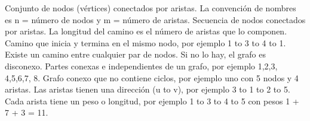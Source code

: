 \markdownRendererDocumentBegin
\markdownRendererSectionBegin
{}\markdownRendererInterblockSeparator
{}\markdownRendererSectionBegin
{}\markdownRendererInterblockSeparator
{}\markdownRendererHardLineBreak
{}Conjunto de nodos (vértices) conectados por aristas.\markdownRendererHardLineBreak
{}La convención de nombres es \markdownRendererDollarSign{}n =\markdownRendererDollarSign{} número de nodos y \markdownRendererDollarSign{}m =\markdownRendererDollarSign{} número de aristas.\markdownRendererParagraphSeparator
{}\markdownRendererHardLineBreak
{}Secuencia de nodos conectados por aristas. La longitud del camino es el número de aristas que lo componen.\markdownRendererParagraphSeparator
{}\markdownRendererHardLineBreak
{}Camino que inicia y termina en el mismo nodo, por ejemplo \markdownRendererDollarSign{}1 \markdownRendererBackslash{}to 3 \markdownRendererBackslash{}to 4 \markdownRendererBackslash{}to 1\markdownRendererDollarSign{}.\markdownRendererParagraphSeparator
{}\markdownRendererHardLineBreak
{}Existe un camino entre cualquier par de nodos. Si no lo hay, el grafo es disconexo.\markdownRendererParagraphSeparator
{}\markdownRendererHardLineBreak
{}Partes conexas e independientes de un grafo, por ejemplo \markdownRendererDollarSign{}\markdownRendererLeftBrace{}1,2,3\markdownRendererRightBrace{}, \markdownRendererLeftBrace{}4,5,6,7\markdownRendererRightBrace{}, \markdownRendererLeftBrace{}8\markdownRendererRightBrace{}\markdownRendererDollarSign{}.\markdownRendererParagraphSeparator
{}\markdownRendererHardLineBreak
{}Grafo conexo que no contiene ciclos, por ejemplo uno con \markdownRendererDollarSign{}5\markdownRendererDollarSign{} nodos y \markdownRendererDollarSign{}4\markdownRendererDollarSign{} aristas.\markdownRendererParagraphSeparator
{}\markdownRendererHardLineBreak
{}Las aristas tienen una dirección \markdownRendererDollarSign{}(u \markdownRendererBackslash{}to v)\markdownRendererDollarSign{}, por ejemplo \markdownRendererDollarSign{}3 \markdownRendererBackslash{}to 1 \markdownRendererBackslash{}to 2 \markdownRendererBackslash{}to 5\markdownRendererDollarSign{}.\markdownRendererParagraphSeparator
{}\markdownRendererHardLineBreak
{}Cada arista tiene un peso o longitud, por ejemplo \markdownRendererDollarSign{}1 \markdownRendererBackslash{}to 3 \markdownRendererBackslash{}to 4 \markdownRendererBackslash{}to 5\markdownRendererDollarSign{} con pesos \markdownRendererDollarSign{}1 + 7 + 3 = 11\markdownRendererDollarSign{}.\markdownRendererParagraphSeparator
